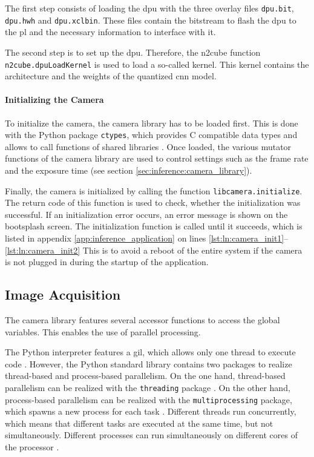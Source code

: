 The first step consists of loading the \acrshort{dpu} with the three overlay files \texttt{dpu.bit}, \texttt{dpu.hwh} and \texttt{dpu.xclbin}.
These files contain the bitstream to flash the \acrshort{dpu} to the \acrlong{pl} and the necessary information to interface with it.

The second step is to set up the \acrshort{dpu}.
Therefore, the \acrshort{n2cube} function \texttt{n2cube.dpuLoadKernel} is used to load a so-called kernel.
This kernel contains the architecture and the weights of the quantized \acrshort{cnn} model.

\paragraph{Initializing the Camera}
To initialize the camera, the camera library has to be loaded first.
This is done with the Python package \texttt{ctypes}, which provides C compatible data types and allows to call functions of shared libraries \cite{inf_ctypes}.
Once loaded, the various mutator functions of the camera library are used to control settings such as the frame rate and the exposure time (see section \ref{sec:inference:camera_library}).

Finally, the camera is initialized by calling the function \texttt{libcamera.initialize}.
The return code of this function is used to check, whether the initialization was successful.
If an initialization error occurs, an error message is shown on the bootsplash screen.
The initialization function is called until it succeeds, which is listed in appendix \ref{app:inference_application} on lines \ref{lst:ln:camera_init1}--\ref{lst:ln:camera_init2}
This is to avoid a reboot of the entire system if the camera is not plugged in during the startup of the application.

\subsection{Image Acquisition}
\label{subsec:inference:app:image_acquisition}

The camera library features several accessor functions to access the global variables.
This enables the use of parallel processing.

The Python interpreter features a \acrfull{gil}, which allows only one thread to execute code \cite{inf_gil}.
However, the Python standard library contains two packages to realize thread-based and process-based parallelism.
On the one hand, thread-based parallelism can be realized with the \texttt{threading} package \cite{inf_threading}.
On the other hand, process-based parallelism can be realized with the \texttt{multiprocessing} package, which spawns a new process for each task \cite{inf_multiprocessing}.
Different threads run concurrently, which means that different tasks are executed at the same time, but not simultaneously.
Different processes can run simultaneously on different cores of the processor \cite{inf_parallelism}.

